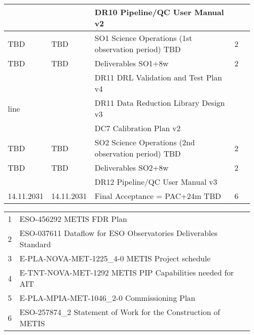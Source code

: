 \begin{table}
\begin{tabularx}{\textwidth}{lllll}
           &		   &	DR10 Pipeline/QC User Manual v2				    &	\\
\hline
TBD        &	TBD        &	SO1 Science Operations (1st observation period) TBD	    &	2 \\
\hline
TBD        &	TBD        &	Deliverables SO1+8w                                         &	2 \\
	   &		   &	DR11 DRL Validation and Test Plan v4			    &	\\
line	   &		   &	DR11 Data Reduction Library Design v3			    &	\\
	   &		   &	DC7 Calibration Plan v2					    &	\\
\hline
TBD        &	TBD        &	SO2 Science Operations (2nd observation period) TBD	    &	2 \\
\hline
TBD        &	TBD        &	Deliverables SO2+8w                                         &	2 \\
	   &		   &	DR12 Pipeline/QC User Manual v3				    &	\\
\hline
14.11.2031 &	14.11.2031 &	Final Acceptance  = PAC+24m  TBD			    &	6 \\
\hline\hline
\end{tabularx}			
\tiny
\begin{tabularx}{\textwidth}{ll}
1 & ESO-456292 METIS FDR Plan  \\
2 & ESO-037611 Dataflow for ESO Observatories Deliverables Standard \\
3 & E-PLA-NOVA-MET-1225_4-0 METIS Project schedule \\
4 & E-TNT-NOVA-MET-1292 METIS PIP Capabilities needed for AIT \\ 
5 & E-PLA-MPIA-MET-1046_2-0 Commissioning Plan \\
6 & ESO-257874_2 Statement of Work for the Construction of METIS \\
\end{tabularx} 




\end{table}

